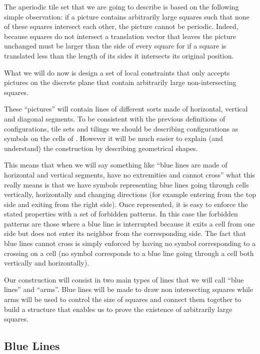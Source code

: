 \documentclass{jac}
\begin{document}
The aperiodic tile set that we are going to describe is based on the following simple observation: if a picture contains arbitrarily large squares such that none of these squares intersect each other, the picture cannot be periodic. Indeed, because squares do not intersect a translation vector that leaves the picture unchanged must be larger than the side of every square for if a square is translated less than the length of its sides it intersects its original position.

What we will do now is design a set of local constraints that only accepts pictures on the discrete plane that contain arbitrarily large non-intersecting squares.

These ``pictures'' will contain lines of different sorts made of horizontal, vertical and diagonal segments. To be consistent with the previous definitions of configurations, tile sets and tilings we should be describing configurations as symbols on the cells of . However it will be much easier to explain (and understand) the construction by describing geometrical shapes.

This means that when we will say something like ``blue lines are made of horizontal and vertical segments, have no extremities and cannot cross'' what this really means is that we have symbols representing blue lines going through cells vertically, horizontally and changing directions (for example entering from the top side and exiting from the right side). Once represented, it is easy to enforce the stated properties with a set of forbidden patterns. In this case the forbidden patterns are those where a blue line is interrupted because it exits a cell from one side but does not enter its neighbor from the corresponding side. The fact that blue lines cannot cross is simply enforced by having no symbol corresponding to a crossing on a cell (no symbol corresponds to a blue line going through a cell both vertically and horizontally).

Our construction will consist in two main types of lines that we will call ``blue lines'' and ``arms''. Blue lines will be made to draw non intersecting squares while arms will be used to control the size of squares and connect them together to build a structure that enables us to prove the existence of arbitrarily large squares.



\subsection{Blue Lines} \label{sub:blue_lines}
\end{document}
